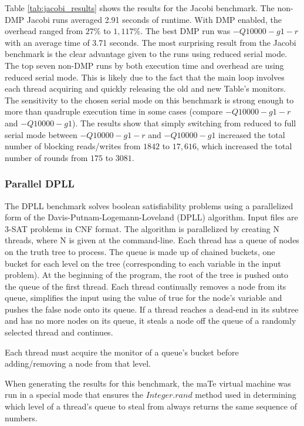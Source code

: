 Table \ref{tab:jacobi_results} shows the results for the Jacobi
benchmark.  The non-DMP Jacobi runs averaged 2.91 seconds of runtime.
With DMP enabled, the overhead ranged from $27\%$ to $1,117\%$.  The
best DMP run was $-Q10000 -g1 -r$ with an average time of 3.71
seconds.  The most surprising result from the Jacobi benchmark is the
clear advantage given to the runs using reduced serial mode.  The top
seven non-DMP runs by both execution time and overhead are using
reduced serial mode.  This is likely due to the fact that the main
loop involves each thread acquiring and quickly releasing the old and
new Table's monitors.  The sensitivity to the chosen serial mode on
this benchmark is strong enough to more than quadruple execution time
in some cases (compare $-Q10000 -g1 -r$ and $-Q10000 -g1$).  The
results show that simply switching from reduced to full serial mode
between $-Q10000 -g1 -r$ and $-Q10000 -g1$ increased the total number
of blocking reads/writes from $1842$ to $17,616$, which increased the
total number of rounds from $175$ to $3081$.

\subsubsection{Parallel DPLL}

The DPLL benchmark solves boolean satisfiability problems using a
parallelized form of the Davis-Putnam-Logemann-Loveland (DPLL)
algorithm.  Input files are 3-SAT problems in CNF format.  The
algorithm is parallelized by creating N threads, where N is given at
the command-line.  Each thread has a queue of nodes on the truth tree
to process.  The queue is made up of chained buckets, one bucket for
each level on the tree (corresponding to each variable in the input
problem).  At the beginning of the program, the root of the tree is
pushed onto the queue of the first thread.  Each thread continually
removes a node from its queue, simplifies the input using the value of
true for the node's variable and pushes the false node onto its queue.
If a thread reaches a dead-end in its subtree and has no more nodes on
its queue, it steals a node off the queue of a randomly selected
thread and continues.

Each thread must acquire the monitor of a queue's bucket before
adding/removing a node from that level.

When generating the results for this benchmark, the maTe virtual
machine was run in a special mode that ensures the $Integer.rand$
method used in determining which level of a thread's queue to steal
from always returns the same sequence of numbers.

